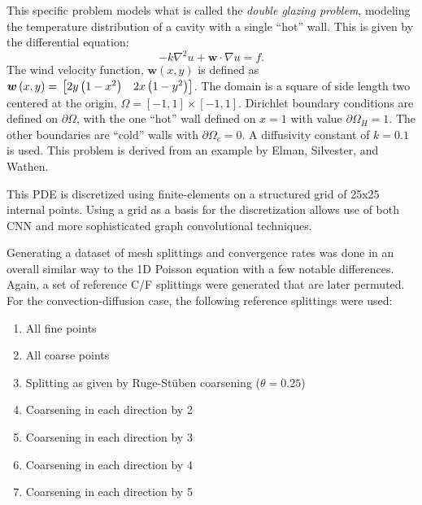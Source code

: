 \documentclass[review]{siamart190516}
\renewcommand{\vec}[1]{\bm{{#1}}}
\newcommand{\grad}{\nabla}
\begin{document}
This specific problem models what is called the \textit{double glazing problem}, modeling the temperature distribution of a cavity with a single ``hot'' wall.  This is given by the differential equation:
%
\begin{equation}\label{eqn:conv}
  -k\grad^2u + \vec{w}\cdot\grad u = f.
\end{equation}
%
The wind velocity function, $\vec{w}\left(x,y\right)$ is defined as $\vec{w}\left(x,y\right)=\\ \begin{bmatrix} 2y\left(1-x^2\right) & 2x\left(1-y^2\right) \end{bmatrix}$.  The domain is a square of side length two centered at the origin, $\Omega = \left[-1,1\right] \times \left[-1,1\right]$.  Dirichlet boundary conditions are defined on $\partial \Omega$, with the one ``hot'' wall defined on $x=1$ with value $\partial \Omega_H=1$.  The other boundaries are ``cold'' walls with $\partial \Omega_c=0$.  A diffusivity constant of $k=0.1$ is used.  This problem is derived from an example by Elman, Silvester, and Wathen\cite{silvester}.

This PDE is discretized using finite-elements on a structured grid of 25x25 internal points.  Using a grid as a basis for the discretization allows use of both CNN and more sophisticated graph convolutional techniques.

Generating a dataset of mesh splittings and convergence rates was done in an overall similar way to the 1D Poisson equation with a few notable differences.  Again, a set of reference C/F splittings were generated that are later permuted.  For the convection-diffusion case, the following reference splittings were used:

\begin{enumerate}
\item All fine points
\item All coarse points
\item Splitting as given by Ruge-St\"{u}ben coarsening ($\theta=0.25$)
\item Coarsening in each direction by 2
\item Coarsening in each direction by 3
\item Coarsening in each direction by 4
\item Coarsening in each direction by 5
\end{enumerate}
\end{document}
